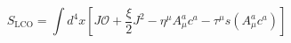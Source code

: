 \begin{equation}
S_{\mathrm{LCO}}=\int d^{4}x\left[ J\mathcal{O} +\frac{\xi }{2}J^{2}-\eta
^{\mu }A_{\mu }^{a}c^{a}-\tau ^{\mu }s(A_{\mu }^{a}c^{a})\right]  \label{lco}
\end{equation}

